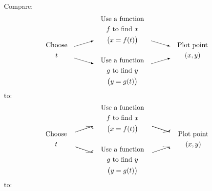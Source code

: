 \documentclass[10pt]{book}
\begin{document}
Compare: %
\[
\begin{gathered}\text{Choose}\\t\end{gathered}\quad
\tikz[>=latex,baseline=(current bounding box.center)]{\draw[->](0,.3)--(1,.6);\draw[->](0,-.3)--(1,-.6);}\quad
\begin{gathered}
\text{Use a function}\\f\text{ to find }x\\\bigl(x=f(t)\bigr)\\\\
\text{Use a function}\\g\text{ to find }y\\\bigl(y=g(t)\bigr)
\end{gathered}\quad
\tikz[>=latex,baseline=(current bounding box.center)]{\draw[->](0,.6)--(1,.3);\draw[->](0,-.6)--(1,-.3);}\quad
\begin{gathered}\text{Plot point}\\(x,y)\end{gathered}
\]
to:
\[
\begin{gathered}\text{Choose}\\t\end{gathered}\quad
\begin{gathered}\scalebox{3}[1]{$\nearrow$}\\\\\scalebox{3}[1]{$\searrow$}\end{gathered}\quad
\begin{gathered}
\text{Use a function}\\f\text{ to find }x\\\bigl(x=f(t)\bigr)\\\\
\text{Use a function}\\g\text{ to find }y\\\bigl(y=g(t)\bigr)
\end{gathered}\quad
\begin{gathered}\scalebox{3}[1]{$\searrow$}\\\\\scalebox{3}[1]{$\nearrow$}\end{gathered}\quad
\begin{gathered}\text{Plot point}\\(x,y)\end{gathered}
\]
to:
\begin{center}
\end{center}
\end{document}
